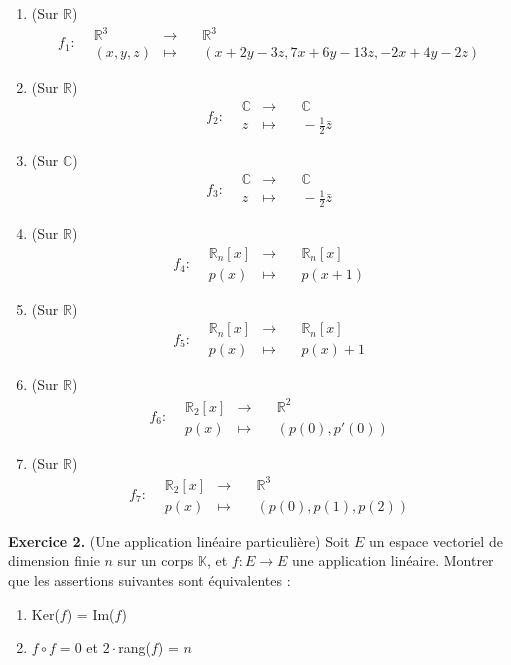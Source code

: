 \documentclass[a4paper, 10pt]{report}
\begin{document}
	\begin{enumerate}[label=\arabic*.]
		\item (Sur $\mathbb{R}$)
		\[f_1: \begin{aligned}
			&\mathbb{R}^3 &\to& \quad \mathbb{R}^3\\
			&(x, y, z) &\mapsto&\quad (x+2y-3z, 7x+6y-13z, -2x+4y-2z)
		\end{aligned}\]
		\item (Sur $\mathbb{R}$)
		\[f_2: \begin{aligned}
			&\mathbb{C} &\to& \quad \mathbb{C}\\
			&z &\mapsto&\quad -\tfrac{1}{2}\bar{z}
		\end{aligned}\]
		\item (Sur $\mathbb{C}$)
		\[f_3: \begin{aligned}
			&\mathbb{C} &\to& \quad \mathbb{C}\\
			&z &\mapsto&\quad -\tfrac{1}{2}\bar{z}
		\end{aligned}\]
		\item (Sur $\mathbb{R}$)
		\[f_4: \begin{aligned}
			&\mathbb{R}_n[x] &\to& \quad \mathbb{R}_n[x]\\
			&p(x) &\mapsto&\quad p(x+1)
		\end{aligned}\]
		\item (Sur $\mathbb{R}$)
		\[f_5: \begin{aligned}
				&\mathbb{R}_n[x] &\to& \quad \mathbb{R}_n[x]\\
			&p(x) &\mapsto&\quad p(x)+1
		\end{aligned}\]
		\item (Sur $\mathbb{R}$)
		\[f_6: \begin{aligned}
			&\mathbb{R}_2[x] &\to& \quad \mathbb{R}^2\\
			&p(x) &\mapsto&\quad (p(0), p'(0))
		\end{aligned}\]
		\item (Sur $\mathbb{R}$)
		\[f_7: \begin{aligned}
			&\mathbb{R}_2[x] &\to& \quad \mathbb{R}^3\\
			&p(x) &\mapsto&\quad (p(0), p(1), p(2))
		\end{aligned}\]
	\end{enumerate}
		
	\vspace{5mm}
	\noindent
	\textbf{Exercice 2.} (Une application linéaire particulière)
	Soit $E$ un espace vectoriel de dimension finie $n$ sur un corps
	$\mathbb{K}$, et $f: E \to E$ une application linéaire. Montrer que
	les assertions suivantes sont équivalentes :
	\begin{enumerate}[label=\arabic*.]
		\item Ker($f$) = Im($f$)
		\item $f \circ f = 0$ et $2 \cdot$rang($f$) = $n$
	\end{enumerate}
	
\end{document}
